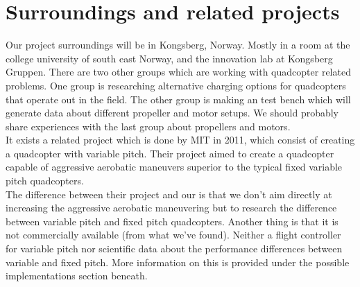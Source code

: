 \section{Surroundings and related projects}

Our project surroundings will be in Kongsberg, Norway. Mostly in a room at the college university of south east Norway, and the innovation lab at Kongsberg Gruppen.
\newline
There are two other groups which are working with quadcopter related problems. One group is researching alternative charging options for quadcopters that operate out in the field. The other group is making an test bench which will generate data about different propeller and motor setups. We should probably share experiences with the last group about propellers and motors.\\
\newline
It exists a related project which is done by MIT in 2011, which consist of creating a quadcopter with variable pitch. Their project aimed to create a quadcopter capable of  aggressive aerobatic maneuvers superior to the typical fixed variable pitch quadcopters. \\
\newline
The difference between their project and our is that we don’t aim directly at increasing the aggressive aerobatic maneuvering but to research the difference between variable pitch and fixed pitch quadcopters.
Another thing is that it is not commercially available (from what we've found).  Neither a flight controller for variable pitch nor scientific data about the performance differences between variable and fixed pitch.
\newline
More information on this is provided under the possible implementations section beneath.